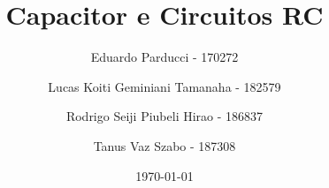 \title{Capacitor e Circuitos RC }
\author{
    Eduardo Parducci - 170272
    \and
    Lucas Koiti Geminiani Tamanaha - 182579
    \and
    Rodrigo Seiji Piubeli Hirao - 186837
    \and
    Tanus Vaz Szabo - 187308
}
\date{\today}